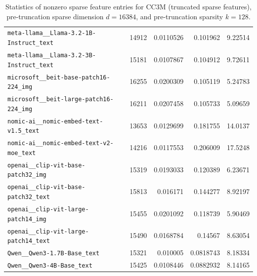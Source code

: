 \begin{table}[htbp]
{\begin{tabular}{lrrrr}
\texttt{meta-llama\_\_Llama-3.2-1B-Instruct\_text} & 14912 & 0.0110526 & 0.101962 & 9.22514 \\
\texttt{meta-llama\_\_Llama-3.2-3B-Instruct\_text} & 15181 & 0.0107867 & 0.104912 & 9.72611 \\
\texttt{microsoft\_\_beit-base-patch16-224\_img} & 16255 & 0.0200309 & 0.105119 & 5.24783 \\
\texttt{microsoft\_\_beit-large-patch16-224\_img} & 16211 & 0.0207458 & 0.105733 & 5.09659 \\
\texttt{nomic-ai\_\_nomic-embed-text-v1.5\_text} & 13653 & 0.0129699 & 0.181755 & 14.0137 \\
\texttt{nomic-ai\_\_nomic-embed-text-v2-moe\_text} & 14216 & 0.0117553 & 0.206009 & 17.5248 \\
\texttt{openai\_\_clip-vit-base-patch32\_img} & 15319 & 0.0193033 & 0.120389 & 6.23671 \\
\texttt{openai\_\_clip-vit-base-patch32\_text} & 15813 & 0.016171 & 0.144277 & 8.92197 \\
\texttt{openai\_\_clip-vit-large-patch14\_img} & 15455 & 0.0201092 & 0.118739 & 5.90469 \\
\texttt{openai\_\_clip-vit-large-patch14\_text} & 15490 & 0.0168784 & 0.14567 & 8.63054 \\
\texttt{Qwen\_\_Qwen3-1.7B-Base\_text} & 15321 & 0.010005 & 0.0818743 & 8.18334 \\
\texttt{Qwen\_\_Qwen3-4B-Base\_text} & 15425 & 0.0108446 & 0.0882932 & 8.14165 \\
\bottomrule
\end{tabular}
}%
\caption{Statistics of nonzero sparse feature entries for CC3M (truncated sparse features), pre-truncation sparse dimension $d=16384$, and pre-truncation sparsity $k=128$.}
\label{tab:sparse-feature-entries-cc3m-truncated-d16384-k128}
\end{table}
